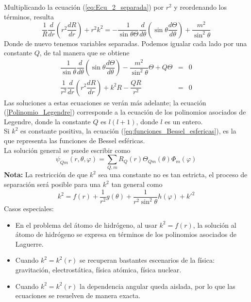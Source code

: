 Multiplicando la ecuación (\ref{eq:Ecu_2_separada}) por $r^{2}$ y reordenando los términos, resulta
\begin{equation}
\dfrac{1}{R} \dfrac{d}{d r} \left( r^{2} \dfrac{d R}{d r} \right) + r^{2} k^{2} = - \dfrac{1}{\sin \theta \Theta} \dfrac{d}{d \theta} \left( \sin \theta \dfrac{d \Theta}{d \theta} \right) + \dfrac{m^{2}}{\sin^{2} \theta}
\end{equation}
Donde de nuevo tenemos variables separadas. Podemos igualar cada lado por una constante $Q$, de tal manera que se obtiene
\begin{eqnarray}
\dfrac{1}{\sin \theta} \dfrac{d}{d \theta} \left( \sin \theta \dfrac{d \Theta}{d \theta} \right) - \dfrac{m^{2}}{\sin^{2} \theta} \Theta + Q \Theta &=& 0 \label{Polinomio_Legendre} \\
\dfrac{1}{r^{2}} \dfrac{d}{d r} \left( r^{2} \dfrac{d R}{d r} \right) + k^{2} R - \dfrac{Q R}{r^{2}} &=& 0 \label{eq:funciones_Bessel_esfericas}
\end{eqnarray}
Las soluciones a estas ecuaciones se verán más adelante; la ecuación (\ref{Polinomio_Legendre}) corresponde a la ecuación de los polinomios asociados de Legendre, donde la constante $Q$ es $l(l+1)$, donde $l$ es un entero.
\\
Si $k^{2}$ es constante positiva, la ecuación (\ref{eq:funciones_Bessel_esfericas}), es la que representa las funciones de Bessel esféricas.
\\
La solución general se puede escribir como
\begin{equation}
\psi_{Qm} (r, \theta, \varphi) = \sum_{Q,m} R_{Q} (r) \Theta_{Qm} (\theta) \Phi_{m} (\varphi)
\end{equation}
\textbf{Nota: } La restricción de que $k^{2}$ sea una constante no es tan estricta, el proceso de separación será posible para una $k^{2}$ tan general como
\begin{equation}
k^{2} =  f(r) + \dfrac{1}{r^{2}} g(\theta) + \dfrac{1}{r^{2} \sin^{2} \theta} h(\varphi) + k'^{2}
\end{equation}
Casos especiales:
\begin{itemize}
\item En el problema del átomo de hidrógeno, al usar $k^{2} = f(r)$, la solución al átomo de hidrógeno se expresa en términos de los polinomios asociados de Laguerre.
\item Cuando $k^{2} = k^{2}(r)$ se recuperan bastantes escenarios de la física: gravitación, electrostática, física atómica, física nuclear.
\item Cuando $k^{2} = k^{2}(r)$ la dependencia angular queda aislada, por lo que las ecuaciones se resuelven de manera exacta.
\end{itemize}
